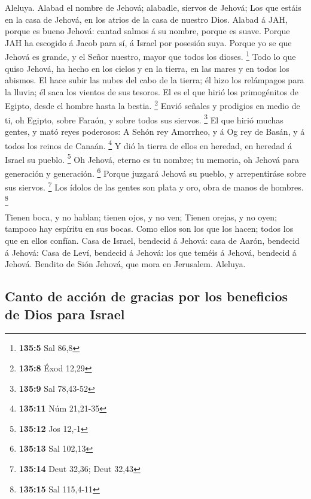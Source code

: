  Aleluya. Alabad el nombre de Jehová; alabadle, siervos de
Jehová;  Los que estáis en la casa de Jehová, en los atrios
de la casa de nuestro Dios.  Alabad á JAH, porque es bueno
Jehová: cantad salmos á su nombre, porque es suave.  Porque
JAH ha escogido á Jacob para sí, á Israel por posesión suya.
 Porque yo se que Jehová es grande, y el Señor nuestro,
mayor que todos los dioses. \footnote{\textbf{135:5} Sal 86,8}
 Todo lo que quiso Jehová, ha hecho en los cielos y en la
tierra, en las mares y en todos los abismos.  El hace subir
las nubes del cabo de la tierra; él hizo los relámpagos para la lluvia;
él saca los vientos de sus tesoros.  El es el que hirió los
primogénitos de Egipto, desde el hombre hasta la bestia. \footnote{\textbf{135:8}
  Éxod 12,29}  Envió señales y prodigios en medio de ti, oh
Egipto, sobre Faraón, y sobre todos sus siervos. \footnote{\textbf{135:9}
  Sal 78,43-52}  El que hirió muchas gentes, y mató reyes
poderosos:  A Sehón rey Amorrheo, y á Og rey de Basán, y á
todos los reinos de Canaán. \footnote{\textbf{135:11} Núm 21,21-35}
 Y dió la tierra de ellos en heredad, en heredad á Israel
su pueblo. \footnote{\textbf{135:12} Jos 12,-1}  Oh Jehová,
eterno es tu nombre; tu memoria, oh Jehová para generación y generación.
\footnote{\textbf{135:13} Sal 102,13}  Porque juzgará
Jehová su pueblo, y arrepentiráse sobre sus siervos. \footnote{\textbf{135:14}
  Deut 32,36; Deut 32,43}  Los ídolos de las gentes son
plata y oro, obra de manos de hombres. \footnote{\textbf{135:15} Sal
  115,4-11}

 Tienen boca, y no hablan; tienen ojos, y no ven;
 Tienen orejas, y no oyen; tampoco hay espíritu en sus
bocas.  Como ellos son los que los hacen; todos los que en
ellos confían.  Casa de Israel, bendecid á Jehová: casa de
Aarón, bendecid á Jehová:  Casa de Leví, bendecid á Jehová:
los que teméis á Jehová, bendecid á Jehová.  Bendito de
Sión Jehová, que mora en Jerusalem. Aleluya.

\hypertarget{canto-de-acciuxf3n-de-gracias-por-los-beneficios-de-dios-para-israel}{%
\subsection{Canto de acción de gracias por los beneficios de Dios para
Israel}\label{canto-de-acciuxf3n-de-gracias-por-los-beneficios-de-dios-para-israel}}

